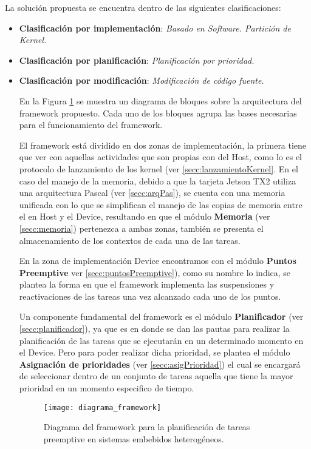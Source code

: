 La solución propuesta se encuentra dentro de las siguientes clasificaciones:
\begin{itemize}

\item \textbf{Clasificación por implementación}: \textit{Basado en Software. Partición de Kernel.}
\item \textbf{Clasificación por planificación}: \textit{Planificación por prioridad.}
\item \textbf{Clasificación por modificación}: \textit{Modificación de código fuente.}



En la Figura \ref{fig:diagramabase} se muestra un diagrama de bloques sobre la arquitectura del framework propuesto. Cada uno de los bloques agrupa las bases necesarias para el funcionamiento del framework.
\newline

El framework está dividido en dos zonas de implementación, la primera tiene que ver con aquellas actividades que son propias con del Host, como lo es el protocolo de lanzamiento de los kernel (ver \ref{secc:lanzamientoKernel}. En el caso del manejo de la memoria, debido a que la tarjeta Jetson TX2 utiliza una arquitectura Pascal (ver \ref{secc:arqPas}), se cuenta con una memoria unificada con lo que se simplifican el manejo de las copias de memoria entre el en Host y el Device, resultando en que el módulo \textbf{Memoria} (ver \ref{secc:memoria}) pertenezca a ambas zonas, también se presenta el almacenamiento de los contextos de cada una de las tareas.

En la zona de implementación Device encontramos con el módulo \textbf{Puntos Preemptive} ver \ref{secc:puntosPreemptive}), como su nombre lo indica, se plantea la forma en que el framework implementa las suspensiones y reactivaciones de las tareas una vez alcanzado cada uno de los puntos. 

Un componente fundamental del framework es el módulo \textbf{Planificador} (ver \ref{secc:planificador}), ya que es en donde se dan las pautas para realizar la planificación de las tareas que se ejecutarán en un determinado momento en el Device. Pero para poder realizar dicha prioridad, se plantea el módulo \textbf{Asignación de prioridades} (ver \ref{secc:asigPrioridad}) el cual se encargará de seleccionar dentro de un conjunto de tareas aquella que tiene la mayor prioridad en un momento especifico de tiempo.

  \begin{figure}[ht]
        \texttt{[image: diagrama\_framework]}
        \caption{Diagrama del framework para la planificación de tareas preemptive en sistemas embebidos heterogéneos.}
        \label{fig:diagramabase}
    \end{figure}
  


\end{itemize}
